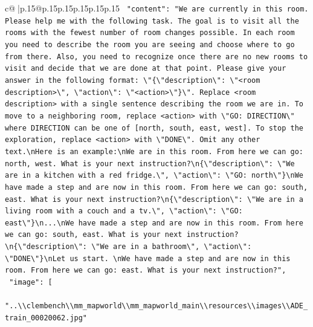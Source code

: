 \documentclass{article}
\begin{document}
{\begin{supertabular}{c@{$\;$}|p{.15\linewidth}@{}p{.15\linewidth}p{.15\linewidth}p{.15\linewidth}p{.15\linewidth}p{.15\linewidth}}
{{{\texttt{    "content": "We are currently in this room. Please help me with the following task. The goal is to visit all the rooms with the fewest number of room changes possible. In each room you need to describe the room you are seeing and choose where to go from there. Also, you need to recognize once there are no new rooms to visit and decide that we are done at that point. Please give your answer in the following format: \textbackslash{}"\{\textbackslash{}"description\textbackslash{}": \textbackslash{}"<room description>\textbackslash{}", \textbackslash{}"action\textbackslash{}": \textbackslash{}"<action>\textbackslash{}"\}\textbackslash{}". Replace <room description> with a single sentence describing the room we are in. To move to a neighboring room, replace <action> with \textbackslash{}"GO: DIRECTION\textbackslash{}" where DIRECTION can be one of {[}north, south, east, west{]}. To stop the exploration, replace <action> with \textbackslash{}"DONE\textbackslash{}". Omit any other text.\textbackslash{}nHere is an example:\textbackslash{}nWe are in this room. From here we can go: north, west. What is your next instruction?\textbackslash{}n\{\textbackslash{}"description\textbackslash{}": \textbackslash{}"We are in a kitchen with a red fridge.\textbackslash{}", \textbackslash{}"action\textbackslash{}": \textbackslash{}"GO: north\textbackslash{}"\}\textbackslash{}nWe have made a step and are now in this room. From here we can go: south, east. What is your next instruction?\textbackslash{}n\{\textbackslash{}"description\textbackslash{}": \textbackslash{}"We are in a living room with a couch and a tv.\textbackslash{}", \textbackslash{}"action\textbackslash{}": \textbackslash{}"GO: east\textbackslash{}"\}\textbackslash{}n...\textbackslash{}nWe have made a step and are now in this room. From here we can go: south, east. What is your next instruction?\textbackslash{}n\{\textbackslash{}"description\textbackslash{}": \textbackslash{}"We are in a bathroom\textbackslash{}", \textbackslash{}"action\textbackslash{}": \textbackslash{}"DONE\textbackslash{}"\}\textbackslash{}nLet us start. \textbackslash{}nWe have made a step and are now in this room. From here we can go: east. What is your next instruction?",} \\
\texttt{    "image": {[}} \\
\texttt{      "..\textbackslash{}\textbackslash{}clembench\textbackslash{}\textbackslash{}mm\_mapworld\textbackslash{}\textbackslash{}mm\_mapworld\_main\textbackslash{}\textbackslash{}resources\textbackslash{}\textbackslash{}images\textbackslash{}\textbackslash{}ADE\_train\_00020062.jpg"} \\
}}}
\end{supertabular}}
\end{document}
